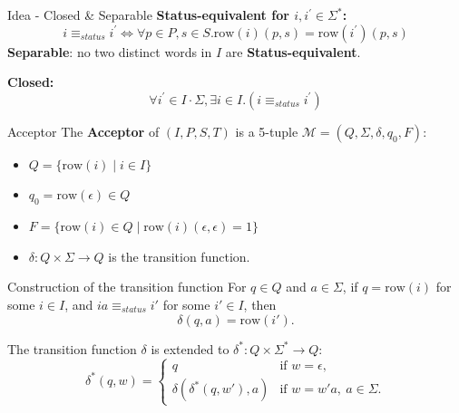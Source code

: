 \documentclass{beamer}
\begin{document}
\begin{frame}{Idea - Closed \& Separable}
    \textbf{Status-equivalent for $i, i^{\prime}\in \Sigma^{*}$: }
    $$
        i \equiv_{status} i^{\prime} \Leftrightarrow  \forall p \in P,s \in S. \text{row}(i)(p,s) = \text{row}(i^{\prime})(p,s)
    $$
    \textbf{Separable}: no two distinct words in $I$ are \textbf{Status-equivalent}. 
    
    \textbf{Closed: }
    $$
        \forall i^{\prime} \in I \cdot \Sigma,  \exists i \in I.(i \equiv_{status} i^{\prime}) 
    $$
\end{frame}

\begin{frame}{Acceptor}
    The \textbf{Acceptor} of $(I,P,S,T)$ is a 5-tuple
    $\mathcal{M}=(Q,\Sigma,\delta,q_0,F)$:
    \begin{itemize}
        \item $Q=\{\text{row}(i)\mid i\in I\}$
        \item $q_0=\text{row}(\epsilon)\in Q$
        \item $F=\{\text{row}(i)\in Q \mid \text{row}(i)(\epsilon,\epsilon)=1\}$
        \item $\delta\colon Q\times\Sigma\to Q$ is the transition function.
    \end{itemize}

    \begin{block}{Construction of the transition function}
        For $q\in Q$ and $a\in\Sigma$, if
        $q=\text{row}(i)$ for some $i\in I$, and
        $ia\equiv_{status}i'$ for some $i'\in I$, then
        \[
            \delta(q,a)=\text{row}(i').
        \]

        The transition function $\delta$ is extended to
        $\delta^*\colon Q\times\Sigma^*\to Q$:
        \[
            \delta^*(q,w)=
            \begin{cases}
                q & \text{if }w=\epsilon,\\
                \delta(\delta^*(q,w'),a)
                & \text{if }w=w'a,\ a\in\Sigma.
            \end{cases}
        \]
    \end{block}
\end{frame}
\end{document}

